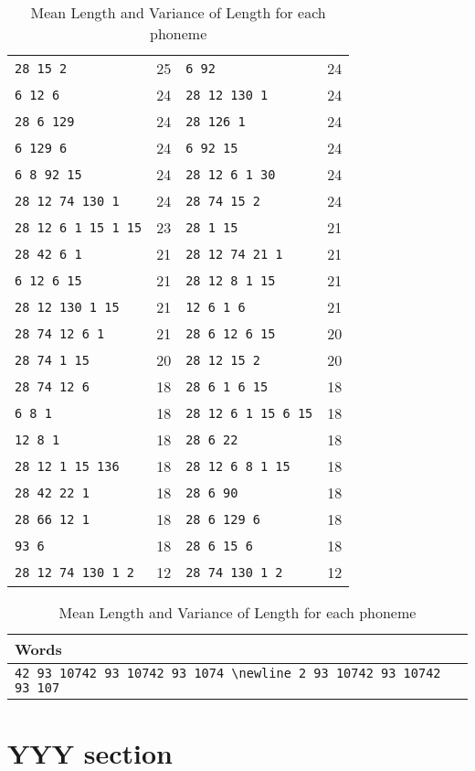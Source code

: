 \documentclass[letterpaper]{article} %
\begin{document}
\begin{table}[th]
\begin{tabular}{lclc}
\verb|28 15 2| & 25 & \verb|6 92| & 24 \\
\verb|6 12 6| & 24 & \verb|28 12 130 1| & 24 \\
\verb|28 6 129| & 24 & \verb|28 126 1| & 24 \\
\verb|6 129 6| & 24 & \verb|6 92 15| & 24 \\
\verb|6 8 92 15| & 24 & \verb|28 12 6 1 30| & 24 \\
\verb|28 12 74 130 1| & 24 & \verb|28 74 15 2| & 24 \\
\verb|28 12 6 1 15 1 15| & 23 & \verb|28 1 15| & 21 \\
\verb|28 42 6 1| & 21 & \verb|28 12 74 21 1| & 21 \\
\verb|6 12 6 15| & 21 & \verb|28 12 8 1 15| & 21 \\
\verb|28 12 130 1 15| & 21 & \verb|12 6 1 6| & 21 \\
\verb|28 74 12 6 1| & 21 & \verb|28 6 12 6 15| & 20 \\
\verb|28 74 1 15| & 20 & \verb|28 12 15 2| & 20 \\
\verb|28 74 12 6| & 18 & \verb|28 6 1 6 15| & 18 \\
\verb|6 8 1| & 18 & \verb|28 12 6 1 15 6 15| & 18 \\
\verb|12 8 1| & 18 & \verb|28 6 22| & 18 \\
\verb|28 12 1 15 136| & 18 & \verb|28 12 6 8 1 15| & 18 \\
\verb|28 42 22 1| & 18 & \verb|28 6 90| & 18 \\
\verb|28 66 12 1| & 18 & \verb|28 6 129 6| & 18 \\
\verb|93 6| & 18 & \verb|28 6 15 6| & 18 \\
\verb|28 12 74 130 1 2| & 12 & \verb|28 74 130 1 2| & 12 \\\hline
\end{tabular}
\caption{Mean Length and Variance of Length for each phoneme}
\label{tab:mlvl}
\end{table}

\begin{table}[th]
\centering
\small
\begin{tabular}{l}
\hline
\textbf{Words}\\
\hline
\verb|42 93 10742 93 10742 93 1074 \newline 2 93 10742 93 10742 93 107| \\
\hline
\end{tabular}
\caption{Mean Length and Variance of Length for each phoneme}
\label{tab:phonemes}
\end{table}

\section{YYY section}
\end{document}
